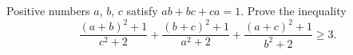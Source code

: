 \problem
Positive numbers $a$, $b$, $c$ satisfy $a b + b c + c a = 1$.
Prove the inequality
\[
    \frac{(a + b)^2 + 1}{c^2 + 2}
    +
    \frac{(b + c)^2 + 1}{a^2 + 2}
    +
    \frac{(a + c)^2 + 1}{b^2 + 2}
\geq
    3
.\]
\solution
\endproblem

